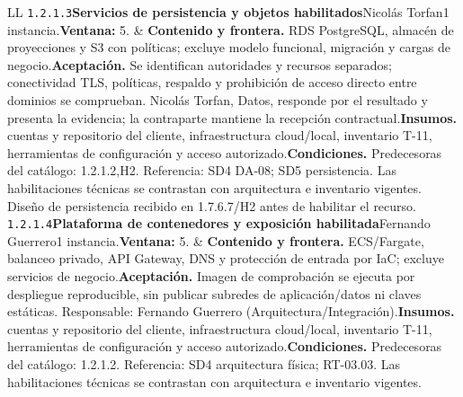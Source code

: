 \begin{longtable}{L{\tabcolsep\relax}L{\tabcolsep\relax}}
\texttt{1.\allowbreak{}2.\allowbreak{}1.\allowbreak{}3}\newline{}\textbf{Servicios de persistencia y objetos habilitados}\newline{}Nicolás Torfan\newline{}1 instancia.\newline{}\textbf{Ventana:} 5. & \textbf{Contenido y frontera.} RDS PostgreSQL, almacén de proyecciones y S3 con políticas; excluye modelo funcional, migración y cargas de negocio.\newline{}\textbf{Aceptación.} Se identifican autoridades y recursos separados; conectividad TLS, políticas, respaldo y prohibición de acceso directo entre dominios se comprueban. Nicolás Torfan, Datos, responde por el resultado y presenta la evidencia; la contraparte mantiene la recepción contractual.\newline{}\textbf{Insumos.} cuentas y repositorio del cliente, infraestructura cloud/local, inventario T-11, herramientas de configuración y acceso autorizado.\newline{}\textbf{Condiciones.} Predecesoras del catálogo: 1.2.1.2,H2. Referencia: SD4 DA-08; SD5 persistencia. Las habilitaciones técnicas se contrastan con arquitectura e inventario vigentes. Diseño de persistencia recibido en 1.7.6.7/H2 antes de habilitar el recurso.\\\hline
\texttt{1.\allowbreak{}2.\allowbreak{}1.\allowbreak{}4}\newline{}\textbf{Plataforma de contenedores y exposición habilitada}\newline{}Fernando Guerrero\newline{}1 instancia.\newline{}\textbf{Ventana:} 5. & \textbf{Contenido y frontera.} ECS/Fargate, balanceo privado, API Gateway, DNS y protección de entrada por IaC; excluye servicios de negocio.\newline{}\textbf{Aceptación.} Imagen de comprobación se ejecuta por despliegue reproducible, sin publicar subredes de aplicación/datos ni claves estáticas. Responsable: Fernando Guerrero (Arquitectura/Integración).\newline{}\textbf{Insumos.} cuentas y repositorio del cliente, infraestructura cloud/local, inventario T-11, herramientas de configuración y acceso autorizado.\newline{}\textbf{Condiciones.} Predecesoras del catálogo: 1.2.1.2. Referencia: SD4 arquitectura física; RT-03.03. Las habilitaciones técnicas se contrastan con arquitectura e inventario vigentes.\\\hline

\end{longtable}
